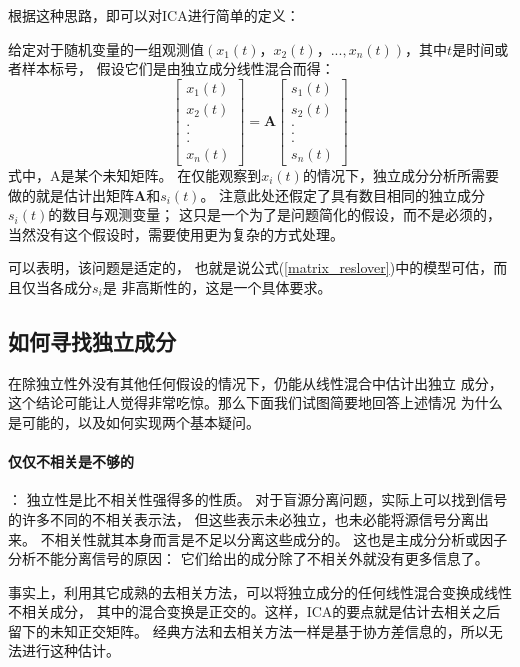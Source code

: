 根据这种思路，即可以对ICA进行简单的定义：

给定对于随机变量的一组观测值$(x_1(t)，x_2(t)，...,x_n(t))$，其中$t$是时间或者样本标号，
假设它们是由独立成分线性混合而得：
\begin{equation} \label{matrix_reslover}
\left[ \begin{array}{c} 
x_1(t) \\
x_2(t) \\
. \\
. \\
. \\
x_n(t)
\end{array} \right]
=\bm{A}
\left[ \begin{array}{c} 
s_1(t) \\
s_2(t) \\
. \\
. \\
. \\
s_n(t)
\end{array} \right]
\end{equation}
式中，A是某个未知矩阵。
在仅能观察到$x_i(t)$的情况下，独立成分分析所需要做的就是估计出矩阵$\bm{A}$和$s_i(t)$。
注意此处还假定了具有数目相同的独立成分$s_i(t)$的数目与观测变量；
这只是一个为了是问题简化的假设，而不是必须的，当然没有这个假设时，需要使用更为复杂的方式处理。

可以表明，该问题是适定的，
也就是说公式(\ref{matrix_reslover})中的模型可估，而且仅当各成分$s_i$是
非高斯性的，这是一个具体要求。
    
\subsection{如何寻找独立成分}
在除独立性外没有其他任何假设的情况下，仍能从线性混合中估计出独立
成分，这个结论可能让人觉得非常吃惊。那么下面我们试图简要地回答上述情况
为什么是可能的，以及如何实现两个基本疑问。
\paragraph*{仅仅不相关是不够的}：
独立性是比不相关性强得多的性质。
对于盲源分离问题，实际上可以找到信号的许多不同的不相关表示法，
但这些表示未必独立，也未必能将源信号分离出来。
不相关性就其本身而言是不足以分离这些成分的。
这也是主成分分析或因子分析不能分离信号的原因：
它们给出的成分除了不相关外就没有更多信息了。

事实上，利用其它成熟的去相关方法，可以将独立成分的任何线性混合变换成线性不相关成分，
其中的混合变换是正交的。这样，ICA的要点就是估计去相关之后留下的未知正交矩阵。
经典方法和去相关方法一样是基于协方差信息的，所以无法进行这种估计。
    
